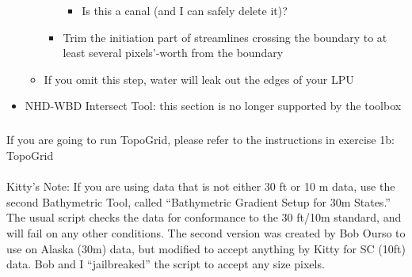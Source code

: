 \documentclass[letterpaper,10pt,english]{sphinxmanual}
\begin{document}
\begin{itemize}
\begin{itemize}
\begin{itemize}
\begin{itemize}
\item {} 
Is this a canal (and I can safely delete it)?

\end{itemize}

\item {} 
Trim the initiation part of streamlines crossing the boundary to at least several pixels’-worth from the boundary

\end{itemize}

\item {} 
If you omit this step, water will leak out the edges of your LPU

\end{itemize}

\item {} 
NHD-WBD Intersect Tool: this section is no longer supported by the toolbox

\end{itemize}


\subparagraph{}
\label{\detokenize{ex_1:topogrid}}
If you are going to run TopoGrid, please refer to the instructions in exercise 1b: TopoGrid


\paragraph{}
\label{\detokenize{ex_1:step-5-toolbox-4-hydrodem-tools}}
Kitty’s Note: If you are using data that is not either 30 ft or 10 m data, use the second Bathymetric Tool, called “Bathymetric Gradient Setup for 30m States.” The usual script checks the data for conformance to the 30 ft/10m standard, and will fail on any other conditions. The second version was created by Bob Ourso to use on Alaska (30m) data, but modified to accept anything by Kitty for SC (10ft) data. Bob and I “jailbreaked” the script to accept any size pixels.
\end{document}
